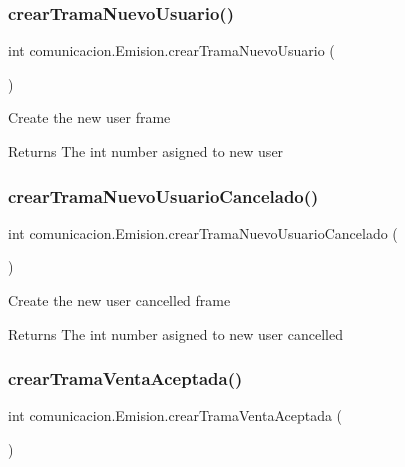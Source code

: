\subsubsection{\texorpdfstring{crear\+Trama\+Nuevo\+Usuario()}{crearTramaNuevoUsuario()}}
{\footnotesize\ttfamily int comunicacion.\+Emision.\+crear\+Trama\+Nuevo\+Usuario (\begin{DoxyParamCaption}{ }\end{DoxyParamCaption})\hspace{0.3cm}{\ttfamily [inline]}}

Create the new user frame \begin{DoxyReturn}{Returns}
The int number asigned to new user 
\end{DoxyReturn}
\mbox{\label{classcomunicacion_1_1_emision_aa2b41a69ac8589e519c45e5f674ab135}} 
\subsubsection{\texorpdfstring{crear\+Trama\+Nuevo\+Usuario\+Cancelado()}{crearTramaNuevoUsuarioCancelado()}}
{\footnotesize\ttfamily int comunicacion.\+Emision.\+crear\+Trama\+Nuevo\+Usuario\+Cancelado (\begin{DoxyParamCaption}{ }\end{DoxyParamCaption})\hspace{0.3cm}{\ttfamily [inline]}}

Create the new user cancelled frame \begin{DoxyReturn}{Returns}
The int number asigned to new user cancelled 
\end{DoxyReturn}
\mbox{\label{classcomunicacion_1_1_emision_ab2a5697489ffb7d87fc89057cc5f9798}} 
\subsubsection{\texorpdfstring{crear\+Trama\+Venta\+Aceptada()}{crearTramaVentaAceptada()}}
{\footnotesize\ttfamily int comunicacion.\+Emision.\+crear\+Trama\+Venta\+Aceptada (\begin{DoxyParamCaption}{ }\end{DoxyParamCaption})\hspace{0.3cm}{\ttfamily [inline]}}

